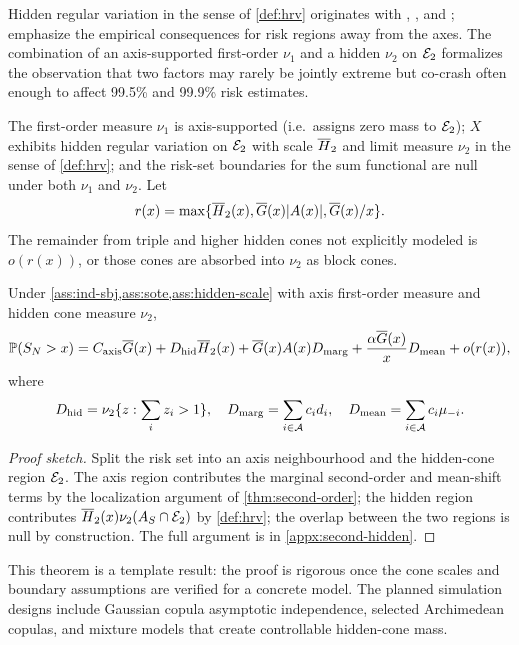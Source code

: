 Hidden regular variation in the sense of \cref{def:hrv} originates with
\citet{LedfordTawn1996}, \citet{Resnick2002}, and
\citet{MaulikResnick2005}; \citet{DasMitraResnick2013} emphasize the
empirical consequences for risk regions away from the axes. The combination
of an axis-supported first-order $\nu_1$ and a hidden $\nu_2$ on $\mathcal{E}_2$
formalizes the observation that two factors may rarely be jointly extreme but
co-crash often enough to affect 99.5\% and 99.9\% risk estimates.

\begin{assumption}
\label{ass:hidden-scale}
The first-order measure $\nu_1$ is axis-supported (i.e.\ assigns zero mass to
$\mathcal{E}_2$); $X$ exhibits hidden regular variation on $\mathcal{E}_2$ with scale
$\overline{H}_2$ and limit measure $\nu_2$ in the sense of \cref{def:hrv}; and the
risk-set boundaries for the sum functional are null under both $\nu_1$ and
$\nu_2$. Let
\[
  r(x)=\max\{\overline{H}_2(x),\overline{G}(x)|A(x)|,\overline{G}(x)/x\}.
\]
The remainder from triple and higher hidden cones not explicitly modeled is
$o(r(x))$, or those cones are absorbed into $\nu_2$ as block cones.
\end{assumption}

\begin{theorem}
\label{thm:hidden-second-order}
Under \cref{ass:ind-sbj,ass:sote,ass:hidden-scale} with axis first-order
measure and hidden cone measure \(\nu_2\),
\[
  \mathbb{P}(S_N>x)
  = C_{\mathrm{axis}}\overline{G}(x)
    + D_{\mathrm{hid}}\overline{H}_2(x)
    + \overline{G}(x)A(x)D_{\mathrm{marg}}
    + \frac{\alpha\overline{G}(x)}{x}D_{\mathrm{mean}}
    + o(r(x)),
\]
where
\[
  D_{\mathrm{hid}}=\nu_2\{z:\sum_i z_i>1\},\quad
  D_{\mathrm{marg}}=\sum_{i\in\mathcal{A}}c_id_i,
  \quad
  D_{\mathrm{mean}}=\sum_{i\in\mathcal{A}}c_i\mu_{-i}.
\]
\end{theorem}

\begin{proof}[Proof sketch]
Split the risk set into an axis neighbourhood and the hidden-cone region
$\mathcal{E}_2$. The axis region contributes the marginal second-order and mean-shift
terms by the localization argument of \cref{thm:second-order}; the hidden
region contributes $\overline{H}_2(x)\nu_2(A_S\cap\mathcal{E}_2)$ by \cref{def:hrv}; the
overlap between the two regions is null by construction. The full argument is
in \cref{appx:second-hidden}.
\end{proof}

This theorem is a template result: the proof is rigorous once the cone scales
and boundary assumptions are verified for a concrete model. The planned
simulation designs include Gaussian copula asymptotic independence, selected
Archimedean copulas, and mixture models that create controllable hidden-cone
mass.

